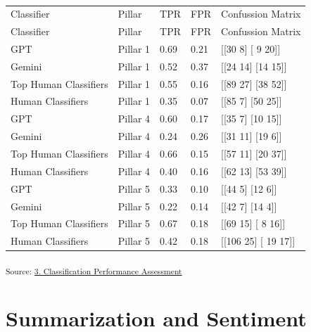 \documentclass[
]{agujournal2019}
\begin{document}
\begin{longtable}[]{@{}lllll@{}}

\caption{\label{tbl-classacc2}Classification Performance Assessment
(Stage 2)}

\tabularnewline

\caption{}\label{T_50cb0}\tabularnewline
\toprule\noalign{}
Classifier & Pillar & TPR & FPR & Confussion Matrix \\
\midrule\noalign{}
\endfirsthead
\toprule\noalign{}
Classifier & Pillar & TPR & FPR & Confussion Matrix \\
\midrule\noalign{}
\endhead
\bottomrule\noalign{}
\endlastfoot
GPT & Pillar 1 & 0.69 & 0.21 & {[}{[}30 8{]} {[} 9 20{]}{]} \\
Gemini & Pillar 1 & 0.52 & 0.37 & {[}{[}24 14{]} {[}14 15{]}{]} \\
Top Human Classifiers & Pillar 1 & 0.55 & 0.16 & {[}{[}89 27{]} {[}38
52{]}{]} \\
Human Classifiers & Pillar 1 & 0.35 & 0.07 & {[}{[}85 7{]} {[}50
25{]}{]} \\
GPT & Pillar 4 & 0.60 & 0.17 & {[}{[}35 7{]} {[}10 15{]}{]} \\
Gemini & Pillar 4 & 0.24 & 0.26 & {[}{[}31 11{]} {[}19 6{]}{]} \\
Top Human Classifiers & Pillar 4 & 0.66 & 0.15 & {[}{[}57 11{]} {[}20
37{]}{]} \\
Human Classifiers & Pillar 4 & 0.40 & 0.16 & {[}{[}62 13{]} {[}53
39{]}{]} \\
GPT & Pillar 5 & 0.33 & 0.10 & {[}{[}44 5{]} {[}12 6{]}{]} \\
Gemini & Pillar 5 & 0.22 & 0.14 & {[}{[}42 7{]} {[}14 4{]}{]} \\
Top Human Classifiers & Pillar 5 & 0.67 & 0.18 & {[}{[}69 15{]} {[} 8
16{]}{]} \\
Human Classifiers & Pillar 5 & 0.42 & 0.18 & {[}{[}106 25{]} {[} 19
17{]}{]} \\

\end{longtable}

\textsubscript{Source:
\href{https://ctoruno.github.io/eu-rol-tracker/notebooks/3_EU_news_classification_accuracy-preview.html\#cell-tbl-classacc2}{3.
Classification Performance Assessment}}

\section{Summarization and Sentiment}\label{summarization-and-sentiment}
\end{document}
